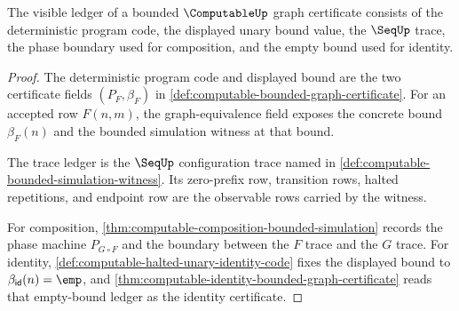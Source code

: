 \begin{theorem}
\label{thm:computable-ledger-obligation}
The visible ledger of a bounded $\ComputableUp$ graph certificate consists of the deterministic program code, the displayed unary bound value, the $\SeqUp$ trace, the phase boundary used for composition, and the empty bound used for identity.
\end{theorem}
\begin{proof}
The deterministic program code and displayed bound are the two certificate fields $(P_F,\beta_F)$ in \autoref{def:computable-bounded-graph-certificate}. For an accepted row $F(n,m)$, the graph-equivalence field exposes the concrete bound $\beta_F(n)$ and the bounded simulation witness at that bound.

The trace ledger is the $\SeqUp$ configuration trace named in \autoref{def:computable-bounded-simulation-witness}. Its zero-prefix row, transition rows, halted repetitions, and endpoint row are the observable rows carried by the witness.

For composition, \autoref{thm:computable-composition-bounded-simulation} records the phase machine $P_{G\circ F}$ and the boundary between the $F$ trace and the $G$ trace. For identity, \autoref{def:computable-halted-unary-identity-code} fixes the displayed bound to $\beta_{\mathsf{id}}(n)=\emp$, and \autoref{thm:computable-identity-bounded-graph-certificate} reads that empty-bound ledger as the identity certificate.
\end{proof}

